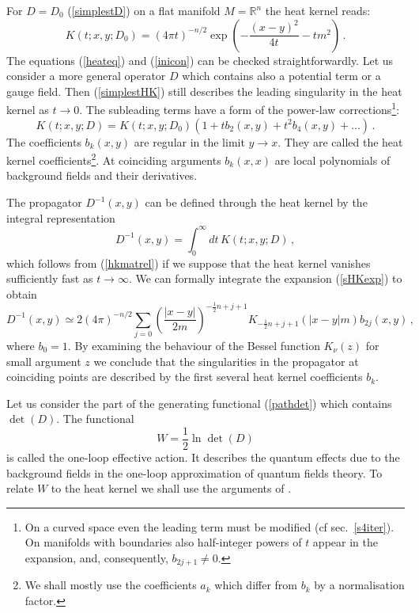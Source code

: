 For $D=D_0$ (\ref{simplestD}) on a flat manifold $M=\mathbb{R}^n$ 
the heat kernel reads:
\begin{equation}
K(t;x,y;D_0)= (4\pi t)^{-n/2} \exp\left(
-\frac{ (x-y)^2}{4t} -tm^2 \right) \,.\label{simplestHK}
\end{equation}
The equations (\ref{heateq}) and (\ref{inicon}) can be checked
straightforwardly. Let us consider a more general operator $D$
which contains also a potential term or a gauge field. Then
(\ref{simplestHK}) still describes the leading singularity
 in the heat kernel as $t\to 0$. The subleading terms have a
form of the power-law corrections\footnote{
On a curved space even the leading term must be modified
(cf sec.\ \ref{s4iter}). On manifolds with boundaries also half-integer
powers of $t$ appear in the expansion, and, consequently,
$b_{2j+1}\ne 0$.}:
\begin{equation}
K(t;x,y;D)=K(t;x,y;D_0) \left( 1 +tb_2(x,y)+t^2b_4(x,y)+\dots
\right) \,.\label{sHKexp}
\end{equation}
The coefficients $b_k(x,y)$ are regular in the limit $y\to x$.
They are called the heat kernel coefficients\footnote{We shall
mostly use the coefficients $a_k$ which differ from $b_k$ by a
normalisation factor.}. At coinciding arguments $b_k(x,x)$ 
are local polynomials of background fields and their derivatives.

The propagator $D^{-1}(x,y)$ can be defined through the heat kernel
by the integral representation
\begin{equation}
D^{-1}(x,y)=\int_0^\infty dt\, K(t;x,y;D)\,,
\label{proptoHK}
\end{equation}
which follows from (\ref{hkmatrel}) if we suppose that the heat kernel
vanishes sufficiently fast as $t\to \infty$. We can formally integrate
the expansion (\ref{sHKexp}) to obtain
\begin{equation}
D^{-1}(x,y) \simeq 2(4\pi )^{-n/2} \sum_{j=0}
\left( \frac{ |x-y|}{2m} \right)^{-\frac 12 n+j+1}
K_{-\frac 12 n+j+1} (|x-y|m)b_{2j}(x,y) \,,\label{DBessel}
\end{equation} 
where $b_0=1$. By examining the behaviour of the Bessel function
$K_\nu (z)$ for small argument $z$ \cite{Gradshteyn:2000}
we conclude that the singularities in the propagator at
coinciding points are described by the first several heat kernel
coefficients $b_k$.

Let us consider the part of the generating functional (\ref{pathdet})
which contains $\det (D)$. The functional 
\begin{equation}
W=\frac 12 \ln \det (D) \label{defW}
\end{equation}
is called the one-loop effective action. It describes the quantum 
effects due to the background fields in the one-loop approximation
of quantum fields theory. To relate $W$ to the heat kernel we shall
use the arguments of \cite{Birrell:1982ix}. 

